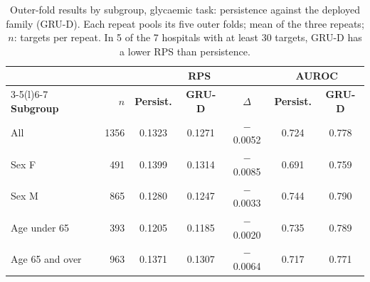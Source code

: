\begin{table}[htbp]
\centering\footnotesize
\caption{Outer-fold results by subgroup, glycaemic task: persistence against the deployed family (GRU-D). Each repeat pools its five outer folds; mean of the three repeats; $n$: targets per repeat. In 5 of the 7 hospitals with at least 30 targets, GRU-D has a lower RPS than persistence.}\label{tab:subgroups-glycaemic}
\begin{tabular}{@{}lrccccc@{}}
\toprule
 & & \multicolumn{3}{c}{\textbf{RPS}} & \multicolumn{2}{c}{\textbf{AUROC}} \\
\cmidrule(lr){3-5}\cmidrule(l){6-7}
\textbf{Subgroup} & \textbf{$n$} & \textbf{Persist.} & \textbf{GRU-D} & \textbf{$\Delta$} & \textbf{Persist.} & \textbf{GRU-D} \\
\midrule
All & 1356 & 0.1323 & 0.1271 & $-$0.0052 & 0.724 & 0.778 \\
Sex F & 491 & 0.1399 & 0.1314 & $-$0.0085 & 0.691 & 0.759 \\
Sex M & 865 & 0.1280 & 0.1247 & $-$0.0033 & 0.744 & 0.790 \\
Age under 65 & 393 & 0.1205 & 0.1185 & $-$0.0020 & 0.735 & 0.789 \\
Age 65 and over & 963 & 0.1371 & 0.1307 & $-$0.0064 & 0.717 & 0.771 \\
\bottomrule
\end{tabular}
\end{table}
